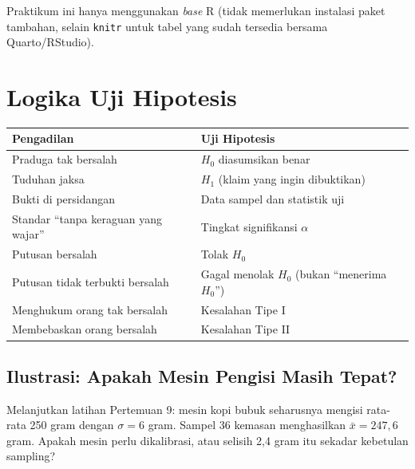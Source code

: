 \documentclass[
  indonesian,
  letterpaper,
]{book}
\newcounter{none} %
\begin{document}
Praktikum ini hanya menggunakan \emph{base} R (tidak memerlukan
instalasi paket tambahan, selain \texttt{knitr} untuk tabel yang sudah
tersedia bersama Quarto/RStudio).


\chapter{Logika Uji Hipotesis}\label{logika-uji-hipotesis}

{\def\LTcaptype{none} %
\begin{longtable}[]{@{}
  >{\raggedright\arraybackslash}p{}
  >{\raggedright\arraybackslash}p{}@{}}
\toprule\noalign{}
\begin{minipage}[b]{\linewidth}\raggedright
Pengadilan
\end{minipage} & \begin{minipage}[b]{\linewidth}\raggedright
Uji Hipotesis
\end{minipage} \\
\midrule\noalign{}
\endhead
\bottomrule\noalign{}
\endlastfoot
Praduga tak bersalah & \(H_0\) diasumsikan benar \\
Tuduhan jaksa & \(H_1\) (klaim yang ingin dibuktikan) \\
Bukti di persidangan & Data sampel dan statistik uji \\
Standar ``tanpa keraguan yang wajar'' & Tingkat signifikansi
\(\alpha\) \\
Putusan bersalah & Tolak \(H_0\) \\
Putusan tidak terbukti bersalah & Gagal menolak \(H_0\) (bukan
``menerima \(H_0\)'') \\
Menghukum orang tak bersalah & Kesalahan Tipe I \\
Membebaskan orang bersalah & Kesalahan Tipe II \\
\end{longtable}
}

\section{Ilustrasi: Apakah Mesin Pengisi Masih
Tepat?}\label{ilustrasi-apakah-mesin-pengisi-masih-tepat}

Melanjutkan latihan Pertemuan 9: mesin kopi bubuk seharusnya mengisi
rata-rata 250 gram dengan \(\sigma = 6\) gram. Sampel 36 kemasan
menghasilkan \(\bar{x} = 247{,}6\) gram. Apakah mesin perlu dikalibrasi,
atau selisih 2,4 gram itu sekadar kebetulan sampling?
\end{document}
